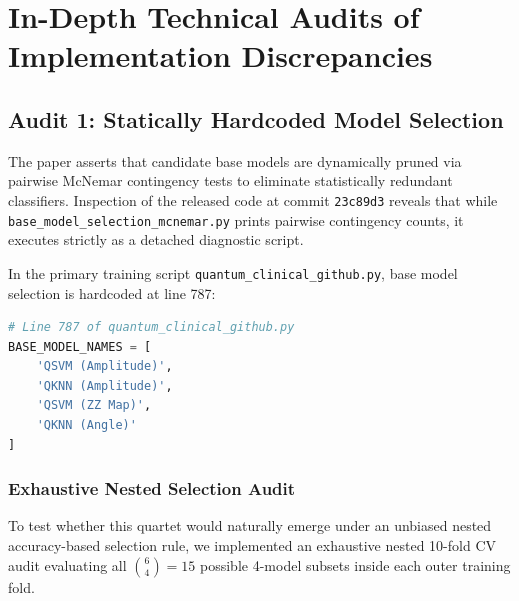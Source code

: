 \section{In-Depth Technical Audits of Implementation Discrepancies}
\label{sec:audits-technical}

\subsection{Audit 1: Statically Hardcoded Model Selection}
The paper asserts that candidate base models are dynamically pruned via pairwise McNemar contingency tests to eliminate statistically redundant classifiers. Inspection of the released code at commit \texttt{23c89d3} reveals that while \texttt{base\_model\_selection\_mcnemar.py} prints pairwise contingency counts, it executes strictly as a detached diagnostic script.

In the primary training script \texttt{quantum\_clinical\_github.py}, base model selection is hardcoded at line 787:
\begin{lstlisting}[language=Python]
# Line 787 of quantum_clinical_github.py
BASE_MODEL_NAMES = [
    'QSVM (Amplitude)',
    'QKNN (Amplitude)',
    'QSVM (ZZ Map)',
    'QKNN (Angle)'
]
\end{lstlisting}

\subsubsection{Exhaustive Nested Selection Audit}
To test whether this quartet would naturally emerge under an unbiased nested accuracy-based selection rule, we implemented an exhaustive nested 10-fold CV audit evaluating all $\binom{6}{4} = 15$ possible 4-model subsets inside each outer training fold.

